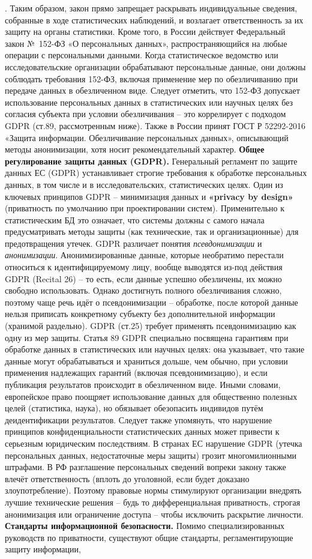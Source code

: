 . Таким образом, закон прямо запрещает раскрывать индивидуальные сведения, собранные в ходе статистических наблюдений, и возлагает ответственность за их защиту на органы статистики. Кроме того, в России действует Федеральный закон № 152-ФЗ «О персональных данных», распространяющийся на любые операции с персональными данными. Когда статистическое ведомство или исследовательские организации обрабатывают персональные данные, они должны соблюдать требования 152-ФЗ, включая применение мер по обезличиванию при передаче данных в обезличенном виде. Следует отметить, что 152-ФЗ допускает использование персональных данных в статистических или научных целях без согласия субъекта при условии обезличивания – это коррелирует с подходом GDPR (ст.89, рассмотренным ниже). Также в России принят ГОСТ Р 52292-2016 «Защита информации. Обезличивание персональных данных», описывающий методы анонимизации, хотя носит рекомендательный характер. \textbf{Общее регулирование защиты данных (GDPR).} Генеральный регламент по защите данных ЕС (GDPR) устанавливает строгие требования к обработке персональных данных, в том числе и в исследовательских, статистических целях. Один из ключевых принципов GDPR – минимизация данных и \textbf{«privacy by design»} (приватность по умолчанию при проектировании систем). Применительно к статистическим БД это означает, что системы должны с самого начала предусматривать методы защиты (как технические, так и организационные) для предотвращения утечек. GDPR различает понятия \textit{псевдонимизации} и \textit{анонимизации}. Анонимизированные данные, которые необратимо перестали относиться к идентифицируемому лицу, вообще выводятся из-под действия GDPR (Recital 26) – то есть, если данные успешно обезличены, их можно свободно использовать. Однако достигнуть полного обезличивания сложно, поэтому чаще речь идёт о псевдонимизации – обработке, после которой данные нельзя приписать конкретному субъекту без дополнительной информации (хранимой раздельно). GDPR (ст.25) требует применять псевдонимизацию как одну из мер защиты. Статья 89 GDPR специально посвящена гарантиям при обработке данных в статистических или научных целях: она указывает, что такие данные могут обрабатываться и храниться дольше, чем обычно, при условии применения надлежащих гарантий (включая псевдонимизацию), и если публикация результатов происходит в обезличенном виде. Иными словами, европейское право поощряет использование данных для общественно полезных целей (статистика, наука), но обязывает обезопасить индивидов путём деидентификации результатов. Следует также упомянуть, что нарушение принципов конфиденциальности статистических данных может привести к серьезным юридическим последствиям. В странах ЕС нарушение GDPR (утечка персональных данных, недостаточные меры защиты) грозит многомилионными штрафами. В РФ разглашение персональных сведений вопреки закону также влечёт ответственность (вплоть до уголовной, если будет доказано злоупотребление). Поэтому правовые нормы стимулируют организации внедрять лучшие технические решения – будь то дифференциальная приватность, строгая анонимизация или ограничение доступа – чтобы исключить раскрытие личности. \textbf{Стандарты информационной безопасности.} Помимо специализированных руководств по приватности, существуют общие стандарты, регламентирующие защиту информации, 
